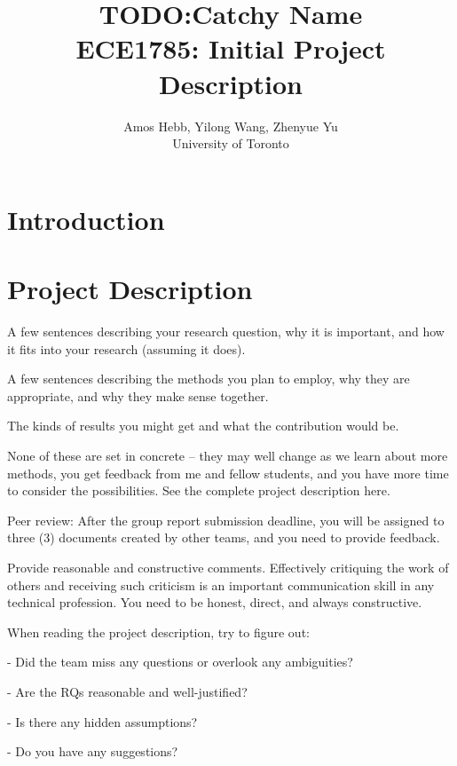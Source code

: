 \documentclass[12pt]{IEEEtran}
\begin{document}
\title{TODO:Catchy Name\\
{\normalsize ECE1785: Initial Project Description}}

\author{Amos Hebb, Yilong Wang, Zhenyue Yu\\ \small University of Toronto}

\maketitle

\section{Introduction}

\section{Project Description}

A few sentences describing your research question, why it is important, and how it fits into your research (assuming it does).

A few sentences describing the methods you plan to employ, why they are appropriate, and why they make sense together.

The kinds of results you might get and what the contribution would be.

None of these are set in concrete -- they may well change as we learn about more methods, you get feedback from me and fellow students, and you have more time to consider the possibilities. See the complete project description here.

Peer review:
After the group report submission deadline, you will be assigned to three (3) documents created by other teams, and you need to provide feedback.

Provide reasonable and constructive comments. Effectively critiquing the work of others and receiving such criticism is an important communication skill in any technical profession. You need to be honest, direct, and always constructive.

When reading the project description, try to figure out:

- Did the team miss any questions or overlook any ambiguities? 

- Are the RQs reasonable and well-justified?

- Is there any hidden assumptions?

- Do you have any suggestions?
\end{document}
